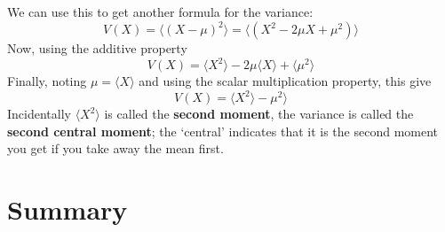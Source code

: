 \documentclass[11pt,a4paper]{scrartcl}
\begin{document}
We can use this to get another formula for the variance:
\begin{equation}
V(X)=\langle (X-\mu)^2\rangle=\langle (X^2-2\mu X+\mu^2)\rangle
\end{equation}
Now, using the additive property
\begin{equation}
V(X)=\langle X^2 \rangle -2\mu\langle X\rangle +\langle \mu^2 \rangle
\end{equation}
Finally, noting $\mu=\langle X\rangle$ and using the scalar multiplication property, this give
\begin{equation}
V(X)=\langle X^2 \rangle - \mu^2 \rangle
\end{equation}
Incidentally $\langle X^2\rangle$ is called the \textbf{second
  moment}, the variance is called the \textbf{second central moment};
the \lq{}central\rq{} indicates that it is the second moment you get
if you take away the mean first.

\section*{Summary}
\end{document}
